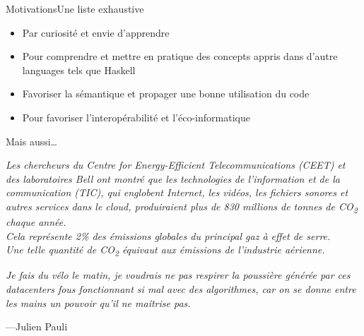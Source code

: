 \begin{frame}{Motivations}{Une liste exhaustive}
    \begin{itemize}[<+->]
        \item Par curiosité et envie d'apprendre
        \item Pour comprendre et mettre en pratique des concepts appris dans
        d'autre languages tels que Haskell
        \item Favoriser la sémantique et propager une bonne utilisation du code
        \item Pour favoriser l'interopérabilité et l'éco-informatique
    \end{itemize}
\end{frame}

\begin{frameC}{Mais aussi\ldots}

\end{frameC}

\begin{frame}
    \begin{flushleft}
        \textit{
            Les chercheurs du Centre for Energy-Efficient Telecommunications (CEET) et des laboratoires Bell ont montré que
            les technologies de l'information et de la communication (TIC), qui englobent Internet, les vidéos, les fichiers sonores
            et autres services dans le cloud, produiraient plus de 830 millions de tonnes de CO\textsubscript{2} chaque année.\\
            \bigskip
            Cela représente 2\% des émissions globales du principal gaz à effet de serre.\\
            \bigskip
            Une telle quantité de CO\textsubscript{2} équivaut aux émissions de l'industrie aérienne.
        }
    \end{flushleft}

\end{frame}

\begin{frame}
    \begin{flushleft}
        \textit{
            Je fais du vélo le matin, je voudrais ne pas respirer la poussière générée
            par ces datacenters fous fonctionnant si mal avec des algorithmes,
            car on se donne entre les mains un pouvoir qu'il ne maîtrise pas.
        }
        \begin{flushright}
            \tiny{---Julien Pauli}
        \end{flushright}
    \end{flushleft}

\end{frame}

